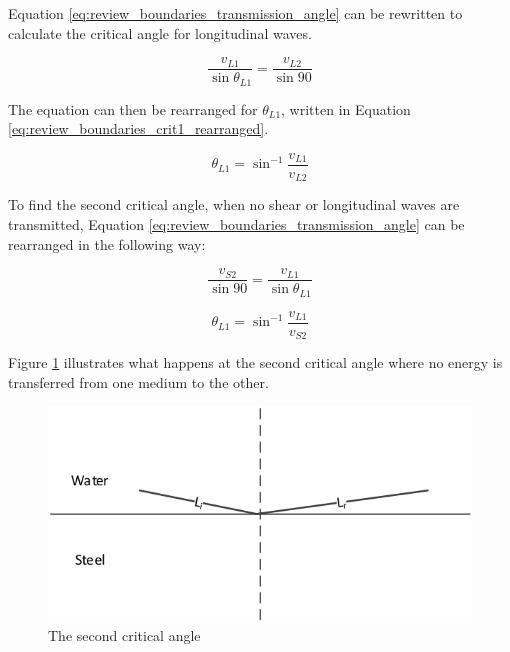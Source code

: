 Equation \ref{eq:review_boundaries_transmission_angle} can be rewritten to calculate the critical angle for longitudinal waves.

\begin{equation} \label{eq:review_boundaries_crit1}
\frac{v_{L1}}{\sin \theta_{L1}} = \frac{v_{L2}}{\sin 90} 
\end{equation}

The equation can then be rearranged for $\theta_{L1}$, written in Equation \ref{eq:review_boundaries_crit1_rearranged}.

\begin{equation} \label{eq:review_boundaries_crit1_rearranged}
\theta_{L1} = \sin^{-1}\frac{v_{L1}}{v_{L2}} 
\end{equation}

To find the second critical angle, when no shear or longitudinal waves are transmitted, Equation \ref{eq:review_boundaries_transmission_angle} can be rearranged in the following way:

\begin{equation} \label{eq:review_boundaries_crit2}
\frac{v_{S2}}{\sin 90} = \frac{v_{L1}}{\sin\theta_{L1}} 
\end{equation}

\begin{equation} \label{eq:review_boundaries_crit2_rearranged}
\theta_{L1} = \sin^{-1}\frac{v_{L1}}{v_{S2}} 
\end{equation}

Figure \ref{fig:review_critang2} illustrates what happens at the second critical angle where no energy is transferred from one medium to the other.

\begin{figure}[!ht]
\centering
		\includegraphics[width=13cm]{CritAngle22.png}
		\caption{The second critical angle}
		\label{fig:review_critang2}
\end{figure}

